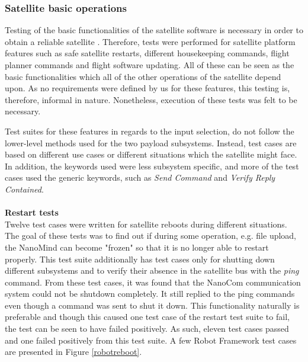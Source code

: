 \documentclass[english,12pt,a4paper,pdftex,elec,utf8]{aaltothesis}
\begin{document}
\subsubsection{Satellite basic operations}
Testing of the basic functionalities of the satellite software is necessary in order to obtain a reliable satellite \cite{Swart1, smallsatconf31, ecss}. Therefore, tests were performed for satellite platform features such as safe satellite restarts, different housekeeping commands, flight planner commands and flight software updating. All of these can be seen as the basic functionalities which all of the other operations of the satellite depend upon. As no requirements were defined by us for these features, this testing is, therefore, informal in nature. Nonetheless, execution of these tests was felt to be necessary.\par 
Test suites for these features in regards to the input selection, do not follow the lower-level methods used for the two payload subsystems. Instead, test cases are based on different use cases or different situations which the satellite might face. In addition, the keywords used were less subsystem specific, and more of the test cases used the generic keywords, such as \textit{Send Command} and \textit{Verify Reply Contained}.\\
\\
\textbf{Restart tests}
\\
Twelve test cases were written for satellite reboots during different situations. The goal of these tests was to find out if during some operation, e.g. file upload, the NanoMind can become "frozen" so that it is no longer able to restart properly. This test suite additionally has test cases only for shutting down different subsystems and to verify their absence in the satellite bus with the \textit{ping} command. From these test cases, it was found that the NanoCom communication system could not be shutdown completely. It still replied to the ping commands even though a command was sent to shut it down. This functionality naturally is preferable and though this caused one test case of the restart test suite to fail, the test can be seen to have failed positively. As such, eleven test cases passed and one failed positively from this test suite. A few Robot Framework test cases are presented in Figure \ref{robotreboot}. \par
\end{document}
